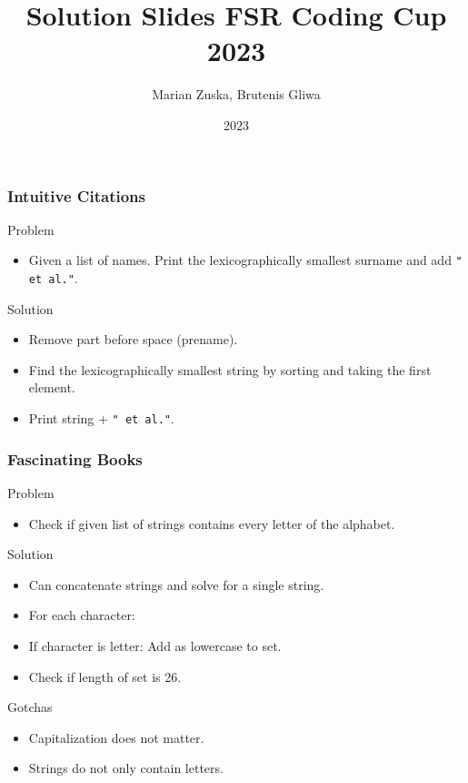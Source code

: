 \documentclass{beamer}
\title{Solution Slides FSR Coding Cup 2023}
\author{Marian Zuska, Brutenis Gliwa}
\institute{Universität Rostock}
\date{2023}
\begin{document}
\frame{\titlepage}

\begin{frame}
    \frametitle{Intuitive Citations}
    \begin{block}{Problem}
        \begin{itemize}
            \item Given a list of names. Print the lexicographically smallest surname and add \texttt{" et al."}.
        \end{itemize}
    \end{block}
    \begin{block}{Solution}
        \begin{itemize}
            \item Remove part before space (prename).
            \item Find the lexicographically smallest string by sorting and taking the first element.
            \item Print string + \texttt{" et al."}.
        \end{itemize}
    \end{block}
\end{frame}

\begin{frame}
    \frametitle{Fascinating Books}
    \begin{block}{Problem}
        \begin{itemize}
            \item Check if given list of strings contains every letter of the alphabet.
        \end{itemize}
    \end{block}
    \begin{block}{Solution}
        \begin{itemize}
            \item Can concatenate strings and solve for a single string.
            \item For each character:
            \item If character is letter: Add as lowercase to set.
            \item Check if length of set is 26.
        \end{itemize}
    \end{block}
    \begin{block}{Gotchas}
        \begin{itemize}
            \item Capitalization does not matter.
            \item Strings do not only contain letters.
        \end{itemize}
    \end{block}
\end{frame}
\end{document}
